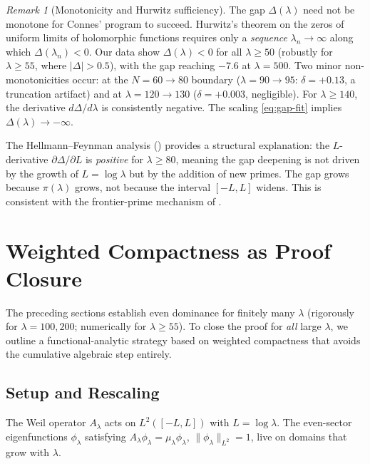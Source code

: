 \documentclass[12pt,a4paper]{article}
\theoremstyle{definition}
\theoremstyle{remark}
\newtheorem{remark}[theorem]{Remark}
\begin{document}
\begin{remark}[Monotonicity and Hurwitz sufficiency]
\label{rem:hurwitz}
The gap $\Delta(\lambda)$ need not be monotone for Connes' program to succeed. Hurwitz's theorem on the zeros of uniform limits of holomorphic functions requires only a \emph{sequence} $\lambda_n \to \infty$ along which $\Delta(\lambda_n) < 0$. Our data show $\Delta(\lambda) < 0$ for all $\lambda \geq 50$ (robustly for $\lambda \geq 55$, where $|\Delta| > 0.5$), with the gap reaching $-7.6$ at $\lambda = 500$. Two minor non-monotonicities occur: at the $N = 60 \to 80$ boundary ($\lambda = 90 \to 95$: $\delta = +0.13$, a truncation artifact) and at $\lambda = 120 \to 130$ ($\delta = +0.003$, negligible). For $\lambda \geq 140$, the derivative $d\Delta/d\lambda$ is consistently negative. The scaling \eqref{eq:gap-fit} implies $\Delta(\lambda) \to -\infty$.

The Hellmann--Feynman analysis () provides a structural explanation: the $L$-derivative $\partial\Delta/\partial L$ is \emph{positive} for $\lambda \geq 80$, meaning the gap deepening is not driven by the growth of $L = \log\lambda$ but by the addition of new primes. The gap grows because $\pi(\lambda)$ grows, not because the interval $[-L, L]$ widens. This is consistent with the frontier-prime mechanism of .
\end{remark}


\section{Weighted Compactness as Proof Closure}
\label{sec:weighted-compactness}

The preceding sections establish even dominance for finitely many $\lambda$ (rigorously for $\lambda = 100, 200$; numerically for $\lambda \geq 55$). To close the proof for \emph{all} large $\lambda$, we outline a functional-analytic strategy based on weighted compactness that avoids the cumulative algebraic step entirely.

\subsection{Setup and Rescaling}

The Weil operator $A_\lambda$ acts on $L^2([-L, L])$ with $L = \log\lambda$. The even-sector eigenfunctions $\phi_\lambda$ satisfying $A_\lambda \phi_\lambda = \mu_\lambda \phi_\lambda$, $\|\phi_\lambda\|_{L^2} = 1$, live on domains that grow with $\lambda$.
\end{document}
